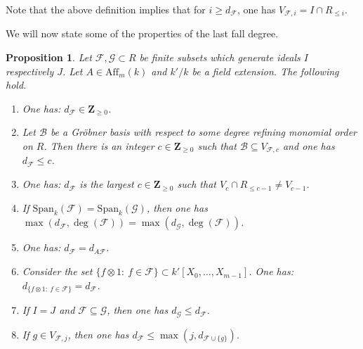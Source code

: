 \documentclass{amsart}
\theoremstyle{plain}
\newtheorem{proposition}[theorem]{Proposition}
\theoremstyle{definition}
\begin{document}
Note that the above definition implies that for $i \geq d_{\mathcal{F}}$, one has $V_{\mathcal{F},i}=I \cap R_{\leq i}$.

We will now state some of the properties of the last fall degree.

\begin{proposition} \label{4444}
Let $\mathcal{F}, \mathcal{G} \subset R$ be finite subsets which generate ideals $I$ respectively $J$. Let $A \in \mathrm{Aff}_m(k)$ and $k'/k$ be a field extension. The following hold.
\begin{enumerate}
\item One has: $d_{\mathcal{F}} \in {\mathbf{Z}}_{\geq 0}$.
\item Let $\mathcal{B}$ be a Gr\"obner basis with respect to some degree refining monomial order on $R$. Then there is an integer $c \in {\mathbf{Z}}_{\geq 0}$ such that $\mathcal{B} \subseteq V_{\mathcal{F},c}$ and one has $d_{\mathcal{F}} \leq c$. 
\item One has: $d_{\mathcal{F}}$ is the largest $c \in {\mathbf{Z}}_{\geq 0}$ such that $V_c \cap R_{\leq c-1} \neq V_{c-1}$.
\item If $\mathrm{Span}_k(\mathcal{F}) = \mathrm{Span}_k(\mathcal{G})$, then one has $\max(d_{\mathcal{F}}, \deg(\mathcal{F}))= \max(d_{\mathcal{G}}, \deg(\mathcal{F}))$.
\item One has: $d_{\mathcal{F}}=d_{A\mathcal{F}}$.
\item Consider the set $\{f \otimes 1:\ f \in \mathcal{F}\} \subset k'[X_0,\ldots,X_{m-1}]$. One has: $d_{\{f \otimes 1:\ f \in \mathcal{F}\}} = d_{\mathcal{F}}$.
\item If $I=J$ and $\mathcal{F} \subseteq \mathcal{G}$, then one has $d_{\mathcal{G}} \leq d_{\mathcal{F}}$.
\item If $g \in V_{\mathcal{F},j}$, then one has $d_{\mathcal{F}} \leq \max(j, d_{\mathcal{F} \cup \{g\}})$.
\end{enumerate}
\end{proposition}
\end{document}
